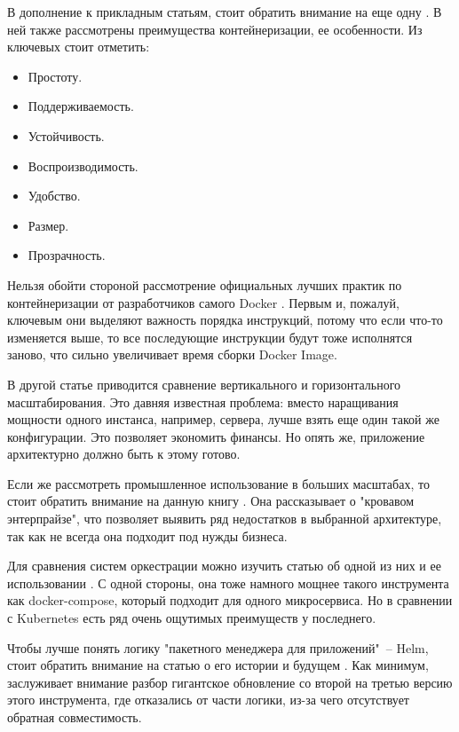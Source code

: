 В дополнение к прикладным статьям, стоит обратить внимание на еще одну \cite{gruening2018recommendations}. В ней также рассмотрены преимущества контейнеризации, ее особенности. Из ключевых стоит отметить:
\begin{itemize}
    \item Простоту.
    \item Поддерживаемость.
    \item Устойчивость.
    \item Воспроизводимость.
    \item Удобство.
    \item Размер.
    \item Прозрачность.
\end{itemize}

Нельзя обойти стороной рассмотрение официальных лучших практик по контейнеризации от разработчиков самого Docker \cite{docker:best-practicies}. Первым и, пожалуй, ключевым они выделяют важность порядка инструкций, потому что если что-то изменяется выше, то все последующие инструкции будут тоже исполнятся заново, что сильно увеличивает время сборки Docker Image.

В другой статье \cite{wang2019developing} приводится сравнение вертикального и горизонтального масштабирования. Это давняя известная проблема: вместо наращивания мощности одного инстанса, например, сервера, лучше взять еще один такой же конфигурации. Это позволяет экономить финансы. Но опять же, приложение архитектурно должно быть к этому готово.

Если же рассмотреть промышленное использование в больших масштабах, то стоит обратить внимание на данную книгу \cite{indrasiri2018microservices}. Она рассказывает о "кровавом энтерпрайзе", что позволяет выявить ряд недостатков в выбранной архитектуре, так как не всегда она подходит под нужды бизнеса.

Для сравнения систем оркестрации можно изучить статью об одной из них и ее использовании \cite{naik2016building}. С одной стороны, она тоже намного мощнее такого инструмента как docker-compose, который подходит для одного микросервиса. Но в сравнении с Kubernetes есть ряд очень ощутимых преимуществ у последнего.

Чтобы лучше понять логику "пакетного менеджера для приложений"\ -- Helm, стоит обратить внимание на статью о его истории и будущем \cite{habr:flant:helm}. Как минимум, заслуживает внимание разбор гигантское обновление со второй на третью версию этого инструмента, где отказались от части логики, из-за чего отсутствует обратная совместимость.

